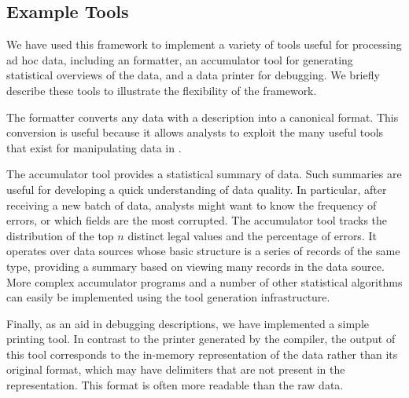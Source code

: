\subsection{Example Tools}
\label{sec:gentool-motivation-ex}

We have used this framework to implement a variety of tools useful for processing ad hoc data, including an \xml{} formatter, an accumulator tool for generating statistical overviews of the data, and a data printer for debugging.  We briefly describe these tools to illustrate the flexibility of the framework.

The \xml{} formatter converts any data with a \padsml{} description
into a canonical \xml{} format.  This conversion is useful because it
allows analysts to exploit the many useful tools that exist for
manipulating data in \xml{}. 

The accumulator tool provides a statistical summary of data.
Such summaries are useful for developing a quick understanding of data quality.  In particular, after receiving a new batch of data, analysts might want to know the frequency of errors, or which fields are the most corrupted. 
The accumulator tool tracks the distribution of the top $n$
distinct legal values and the percentage of errors. 
It operates over data sources
whose basic structure is a series of records of the same type, 
providing a summary based on viewing many records
in the data source.    More complex accumulator programs and a number of other statistical algorithms can easily be implemented using the tool generation infrastructure.

Finally, as an aid in debugging \padsml{} descriptions, we have implemented a simple printing tool.  In contrast to the printer generated by the \padsml{} compiler, the output of this tool corresponds to the in-memory
representation of the data rather than its original format, which may have delimiters \etc{} that are not present in the representation.  This format is often more readable than the raw data.

